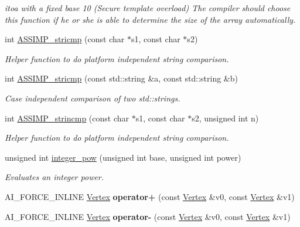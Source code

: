 \begin{DoxyCompactItemize}
\begin{DoxyCompactList}\small\item\em itoa with a fixed base 10 (Secure template overload) The compiler should choose this function if he or she is able to determine the size of the array automatically. \end{DoxyCompactList}\item 
int \hyperlink{namespace_assimp_a72851b2740829d0e26ee31da7af20ce6}{A\+S\+S\+I\+M\+P\+\_\+stricmp} (const char $\ast$s1, const char $\ast$s2)
\begin{DoxyCompactList}\small\item\em Helper function to do platform independent string comparison. \end{DoxyCompactList}\item 
int \hyperlink{namespace_assimp_abd7b0704eb33d941b05a778f916cf963}{A\+S\+S\+I\+M\+P\+\_\+stricmp} (const std\+::string \&a, const std\+::string \&b)
\begin{DoxyCompactList}\small\item\em Case independent comparison of two std\+::strings. \end{DoxyCompactList}\item 
int \hyperlink{namespace_assimp_a5718d462fef0070afea1d4ac4e65d4d8}{A\+S\+S\+I\+M\+P\+\_\+strincmp} (const char $\ast$s1, const char $\ast$s2, unsigned int n)
\begin{DoxyCompactList}\small\item\em Helper function to do platform independent string comparison. \end{DoxyCompactList}\item 
unsigned int \hyperlink{namespace_assimp_a7f1165ac9e907c30dbbba7657c651b4e}{integer\+\_\+pow} (unsigned int base, unsigned int power)
\begin{DoxyCompactList}\small\item\em Evaluates an integer power. \end{DoxyCompactList}\item 
\hypertarget{namespace_assimp_a26ab9ab92b7b78ef60b4e63e0dbc2f75}{A\+I\+\_\+\+F\+O\+R\+C\+E\+\_\+\+I\+N\+L\+I\+N\+E \hyperlink{struct_assimp_1_1_m_d2_1_1_vertex}{Vertex} {\bfseries operator+} (const \hyperlink{struct_assimp_1_1_m_d2_1_1_vertex}{Vertex} \&v0, const \hyperlink{struct_assimp_1_1_m_d2_1_1_vertex}{Vertex} \&v1)}\label{namespace_assimp_a26ab9ab92b7b78ef60b4e63e0dbc2f75}

\item 
\hypertarget{namespace_assimp_a3b3364133e7a8b1b96d5839dcd53611c}{A\+I\+\_\+\+F\+O\+R\+C\+E\+\_\+\+I\+N\+L\+I\+N\+E \hyperlink{struct_assimp_1_1_m_d2_1_1_vertex}{Vertex} {\bfseries operator-\/} (const \hyperlink{struct_assimp_1_1_m_d2_1_1_vertex}{Vertex} \&v0, const \hyperlink{struct_assimp_1_1_m_d2_1_1_vertex}{Vertex} \&v1)}\label{namespace_assimp_a3b3364133e7a8b1b96d5839dcd53611c}


\end{DoxyCompactItemize}
